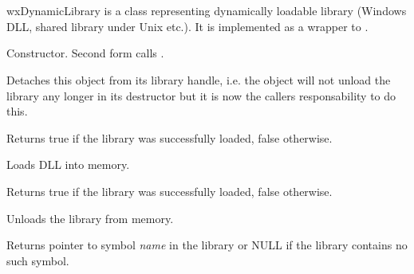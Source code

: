 
\section{}\label{wxdynamiclibrary}

wxDynamicLibrary is a class representing dynamically loadable library
(Windows DLL, shared library under Unix etc.). It is implemented as a wrapper
to .



\label{wxdynamiclibrarywxdynamiclibrary}



Constructor. Second form calls .

\label{wxdynamiclibrarydetach}


Detaches this object from its library handle, i.e. the object will not unload
the library any longer in its destructor but it is now the callers
responsability to do this.

\label{wxdynamiclibraryisloaded}


Returns true if the library was successfully loaded, false otherwise.

\label{wxdynamiclibraryload}


Loads DLL into memory.

Returns true if the library was successfully loaded, false otherwise.

\label{wxdynamiclibraryunload}


Unloads the library from memory.

\label{wxdynamiclibrarygetsymbol}


Returns pointer to symbol {\it name} in the library or NULL if the library
contains no such symbol.



